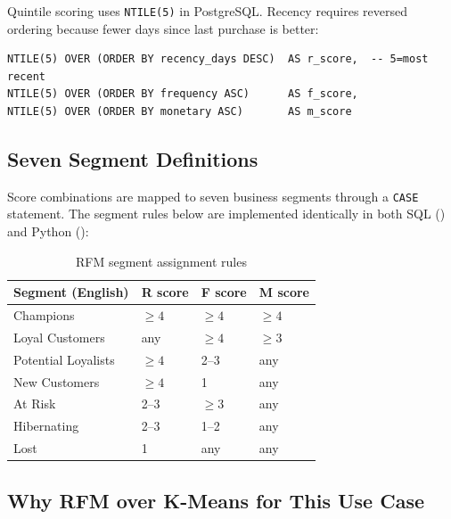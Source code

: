 Quintile scoring uses \texttt{NTILE(5)} in PostgreSQL. Recency requires reversed
ordering because fewer days since last purchase is better:

\begin{lstlisting}[style=sql, caption={Quintile scoring in \filepath{sql/03\_rfm\_segmentation.sql}}]
NTILE(5) OVER (ORDER BY recency_days DESC)  AS r_score,  -- 5=most recent
NTILE(5) OVER (ORDER BY frequency ASC)      AS f_score,
NTILE(5) OVER (ORDER BY monetary ASC)       AS m_score
\end{lstlisting}

\subsection{Seven Segment Definitions}

Score combinations are mapped to seven business segments through a \texttt{CASE}
statement. The segment rules below are implemented identically in both SQL
() and Python
():

\begin{table}[h]
\centering
\caption{RFM segment assignment rules}
\label{tab:rfm-segments}
\begin{tabular}{llll}
\toprule
\textbf{Segment (English)} & \textbf{R score} & \textbf{F score} & \textbf{M score} \\
\midrule
Champions                 & $\geq 4$  & $\geq 4$  & $\geq 4$  \\
Loyal Customers           & any       & $\geq 4$  & $\geq 3$  \\
Potential Loyalists       & $\geq 4$  & 2--3      & any       \\
New Customers             & $\geq 4$  & 1         & any       \\
At Risk                   & 2--3      & $\geq 3$  & any       \\
Hibernating               & 2--3      & 1--2      & any       \\
Lost                      & 1         & any       & any       \\
\bottomrule
\end{tabular}
\end{table}

\subsection{Why RFM over K-Means for This Use Case}

